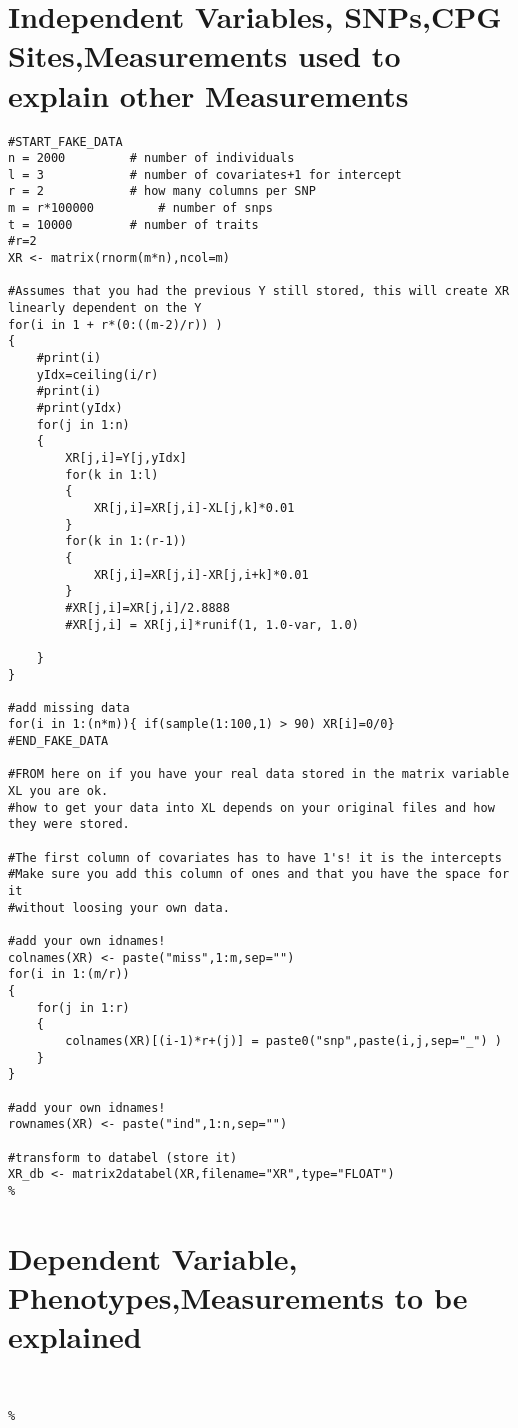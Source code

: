 \documentclass{report}
\begin{document}
\section{Independent Variables, SNPs,CPG Sites,Measurements used to explain other Measurements}
\begin{lstlisting}[style=BASH,escapechar=\%]
#START_FAKE_DATA
n = 2000		 # number of individuals
l = 3   		 # number of covariates+1 for intercept
r = 2 			 # how many columns per SNP
m = r*100000		 # number of snps
t = 10000  		 # number of traits
#r=2
XR <- matrix(rnorm(m*n),ncol=m)

#Assumes that you had the previous Y still stored, this will create XR linearly dependent on the Y
for(i in 1 + r*(0:((m-2)/r)) )
{ 
	#print(i)
	yIdx=ceiling(i/r)
	#print(i)
	#print(yIdx)
	for(j in 1:n)
	{ 
		XR[j,i]=Y[j,yIdx]
		for(k in 1:l)
		{
			XR[j,i]=XR[j,i]-XL[j,k]*0.01
		}
		for(k in 1:(r-1))
		{
			XR[j,i]=XR[j,i]-XR[j,i+k]*0.01
		}
		#XR[j,i]=XR[j,i]/2.8888
		#XR[j,i] = XR[j,i]*runif(1, 1.0-var, 1.0)
		
	}
}

#add missing data
for(i in 1:(n*m)){ if(sample(1:100,1) > 90) XR[i]=0/0}
#END_FAKE_DATA

#FROM here on if you have your real data stored in the matrix variable XL you are ok.
#how to get your data into XL depends on your original files and how they were stored.

#The first column of covariates has to have 1's! it is the intercepts
#Make sure you add this column of ones and that you have the space for it
#without loosing your own data.

#add your own idnames!
colnames(XR) <- paste("miss",1:m,sep="")
for(i in 1:(m/r))
{
	for(j in 1:r) 
	{
		colnames(XR)[(i-1)*r+(j)] = paste0("snp",paste(i,j,sep="_") )
	}
}

#add your own idnames!
rownames(XR) <- paste("ind",1:n,sep="")

#transform to databel (store it)
XR_db <- matrix2databel(XR,filename="XR",type="FLOAT")
%
\end{lstlisting}

\section{Dependent Variable, Phenotypes,Measurements to be explained}

\begin{lstlisting}[style=BASH,escapechar=\%]


%
\end{lstlisting}
\end{document}
